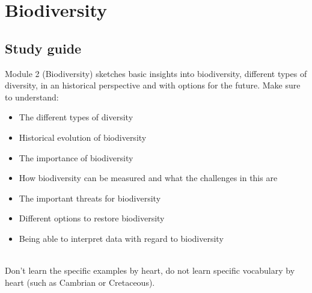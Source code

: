 \documentclass[../summary.tex]{subfiles}
\begin{document}
\section{Biodiversity}

\subsection{Study guide}

Module 2 (Biodiversity) sketches basic insights into biodiversity, different types of diversity, in an historical perspective and with options for the future. Make sure to understand:
\begin{itemize}
	\setlength{\itemsep}{0pt}
	\item The different types of diversity
	\item Historical evolution of biodiversity
	\item The importance of biodiversity
	\item How biodiversity can be measured and what the challenges in this are
	\item The important threats for biodiversity
	\item Different options to restore biodiversity
	\item Being able to interpret data with regard to biodiversity
\end{itemize}
\ \\
Don't learn the specific examples by heart, do not learn specific vocabulary by heart (such as Cambrian or Cretaceous).
\\
\end{document}
